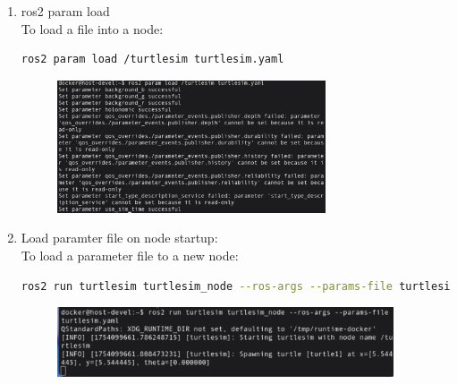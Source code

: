 \documentclass[12pt, a4paper]{article}
\begin{document}
\begin{enumerate}
\newpage
\item ros2 param load\\
To load a file into a node:
\begin{lstlisting}[language=bash]
ros2 param load /turtlesim turtlesim.yaml
\end{lstlisting}
\begin{figure}[h]
	\centering
	\includegraphics[width=0.75\textwidth]{p1.6-6}
\end{figure}
\item Load paramter file on node startup:\\
To load a parameter file to a new node:
\begin{lstlisting}[language=bash]
ros2 run turtlesim turtlesim_node --ros-args --params-file turtlesim.yaml
\end{lstlisting}
\begin{figure}[h]
	\setlength{\leftskip}{2.4em}
	\includegraphics[width=0.94\textwidth]{p1.6-7}
\end{figure}
\end{enumerate}

\newpage
\end{document}
